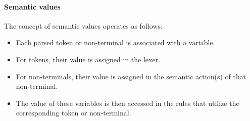 \paragraph*{Semantic values}
The concept of semantic values operates as follows:
\begin{itemize}
    \item Each parsed token or non-terminal is associated with a variable.
    \item For tokens, their value is assigned in the lexer.
    \item For non-terminals, their value is assigned in the semantic action(s) of that non-terminal.
    \item The value of these variables is then accessed in the rules that utilize the corresponding token or non-terminal.
\end{itemize}

